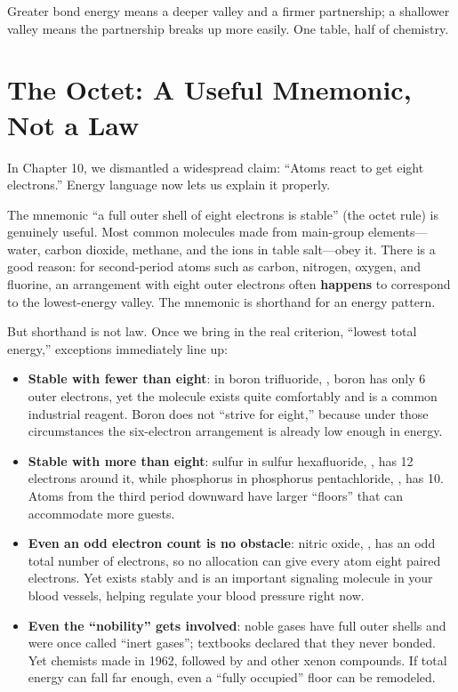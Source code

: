 Greater bond energy means a deeper valley and a firmer partnership; a shallower valley means the partnership breaks up more easily. One table, half of chemistry.

\section{The Octet: A Useful Mnemonic, Not a Law}

In Chapter 10, we dismantled a widespread claim: ``Atoms react to get eight electrons.'' Energy language now lets us explain it properly.

The mnemonic ``a full outer shell of eight electrons is stable'' (the octet rule) is genuinely useful. Most common molecules made from main-group elements---water, carbon dioxide, methane, and the ions in table salt---obey it. There is a good reason: for second-period atoms such as carbon, nitrogen, oxygen, and fluorine, an arrangement with eight outer electrons often \textbf{happens} to correspond to the lowest-energy valley. The mnemonic is shorthand for an energy pattern.

But shorthand is not law. Once we bring in the real criterion, ``lowest total energy,'' exceptions immediately line up:

\begin{itemize}[itemsep=2pt]
\item \textbf{Stable with fewer than eight}: in boron trifluoride, , boron has only 6 outer electrons, yet the molecule exists quite comfortably and is a common industrial reagent. Boron does not ``strive for eight,'' because under those circumstances the six-electron arrangement is already low enough in energy.
\item \textbf{Stable with more than eight}: sulfur in sulfur hexafluoride, , has 12 electrons around it, while phosphorus in phosphorus pentachloride, , has 10. Atoms from the third period downward have larger ``floors'' that can accommodate more guests.
\item \textbf{Even an odd electron count is no obstacle}: nitric oxide, , has an odd total number of electrons, so no allocation can give every atom eight paired electrons. Yet  exists stably and is an important signaling molecule in your blood vessels, helping regulate your blood pressure right now.
\item \textbf{Even the ``nobility'' gets involved}: noble gases have full outer shells and were once called ``inert gases''; textbooks declared that they never bonded. Yet chemists made  in 1962, followed by  and other xenon compounds. If total energy can fall far enough, even a ``fully occupied'' floor can be remodeled.
\end{itemize}

